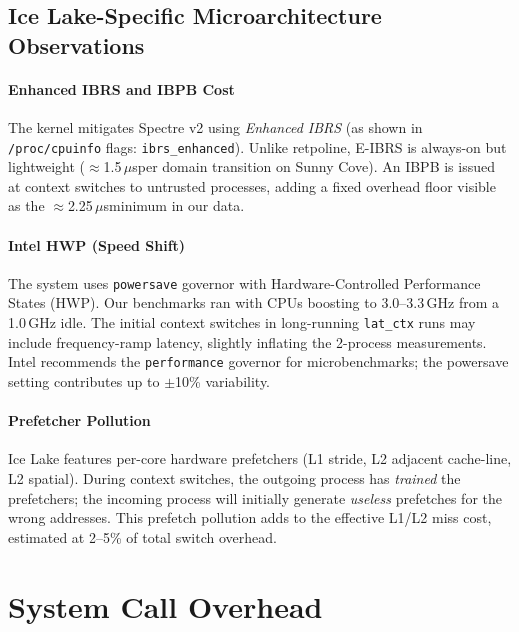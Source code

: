 \documentclass[12pt,a4paper]{article}
\newcommand{\us}{$\mu$s}
\begin{document}
\subsection{Ice Lake-Specific Microarchitecture Observations}

\paragraph{Enhanced IBRS and IBPB Cost}
The kernel mitigates Spectre v2 using \textit{Enhanced IBRS} (as shown in
\texttt{/proc/cpuinfo} flags: \texttt{ibrs\_enhanced}). Unlike retpoline, E-IBRS
is always-on but lightweight ($\approx$1.5\,\us per domain transition on Sunny
Cove). An IBPB is issued at context switches to untrusted processes, adding a
fixed overhead floor visible as the $\approx$2.25\,\us minimum in our data.

\paragraph{Intel HWP (Speed Shift)}
The system uses \texttt{powersave} governor with Hardware-Controlled Performance
States (HWP). Our benchmarks ran with CPUs boosting to 3.0–3.3\,GHz from a
1.0\,GHz idle. The initial context switches in long-running \texttt{lat\_ctx}
runs may include frequency-ramp latency, slightly inflating the 2-process
measurements. Intel recommends the \texttt{performance} governor for
microbenchmarks; the powersave setting contributes up to $\pm$10\% variability.

\paragraph{Prefetcher Pollution}
Ice Lake features per-core hardware prefetchers (L1 stride, L2 adjacent
cache-line, L2 spatial). During context switches, the outgoing process has
\textit{trained} the prefetchers; the incoming process will initially generate
\textit{useless} prefetches for the wrong addresses. This prefetch pollution
adds to the effective L1/L2 miss cost, estimated at 2–5\% of total switch overhead.

\section{System Call Overhead}
\label{sec:syscall}
\end{document}
